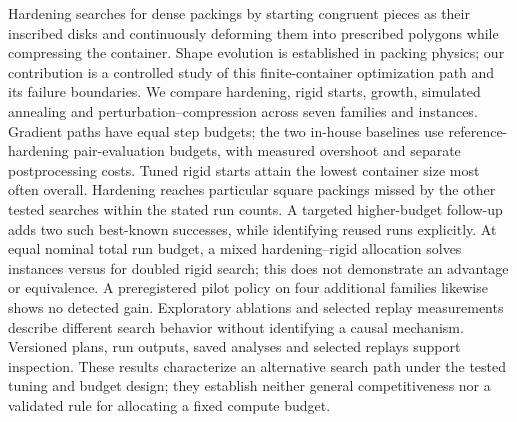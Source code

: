 Hardening searches for dense packings by starting congruent pieces as their inscribed disks and continuously deforming them into prescribed polygons while compressing the container. Shape evolution is established in packing physics; our contribution is a controlled study of this finite-container optimization path and its failure boundaries. We compare hardening, rigid starts, growth, simulated annealing and perturbation--compression across seven families and \CsevenInstances{} instances. Gradient paths have equal step budgets; the two in-house baselines use reference-hardening pair-evaluation budgets, with measured overshoot and separate postprocessing costs. Tuned rigid starts attain the lowest container size most often overall. Hardening reaches particular square packings missed by the other tested searches within the stated run counts. A targeted higher-budget follow-up adds two such best-known successes, while identifying reused runs explicitly. At equal nominal total run budget, a mixed hardening--rigid allocation solves \PortRigidHarden{} instances versus \PortRigidSixtyFour{} for doubled rigid search; this does not demonstrate an advantage or equivalence. A preregistered pilot policy on four additional families likewise shows no detected gain. Exploratory ablations and selected replay measurements describe different search behavior without identifying a causal mechanism. Versioned plans, run outputs, saved analyses and selected replays support inspection. These results characterize an alternative search path under the tested tuning and budget design; they establish neither general competitiveness nor a validated rule for allocating a fixed compute budget.
